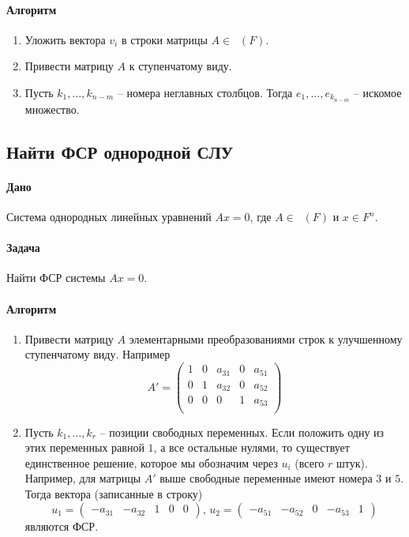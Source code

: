 \documentclass{article}
\newcommand{\MatrixDim}[3]{\mathop{\mathrm{M}_{#2\,#3}}(#1)}
\begin{document}
\paragraph{Алгоритм}
\begin{enumerate}
\item Уложить вектора $v_i$ в строки матрицы $A\in\MatrixDim{F}{m}{n}$.

\item Привести матрицу $A$ к ступенчатому виду.

\item Пусть $k_1,\ldots,k_{n-m}$ -- номера неглавных столбцов. Тогда $e_1,\ldots,e_{k_{n-m}}$ -- искомое множество.
\end{enumerate}

\subsection{Найти ФСР однородной СЛУ}

\paragraph{Дано} Система однородных линейных уравнений $Ax = 0$, где $A\in \MatrixDim{F}{m}{n}$ и $x\in F^{n}$.

\paragraph{Задача} Найти ФСР системы $Ax = 0$.

\paragraph{Алгоритм}
\begin{enumerate}
\item Привести матрицу $A$ элементарными преобразованиями строк к улучшенному ступенчатому виду. Например
\[
A' = 
\begin{pmatrix}
{1}&{0}&{a_{31}}&{0}&{a_{51}}\\
{0}&{1}&{a_{32}}&{0}&{a_{52}}\\
{0}&{0}&{0}&{1}&{a_{53}}\\
\end{pmatrix}
\]

\item Пусть $k_1,\ldots,k_r$ -- позиции свободных переменных. Если положить одну из этих переменных равной $1$, а все остальные нулями, то существует единственное решение, которое мы обозначим через $u_i$ (всего $r$ штук). Например, для матрицы $A'$ выше свободные переменные имеют номера $3$ и $5$. Тогда вектора (записанные в строку)
\[
u_1 = 
\begin{pmatrix}
{-a_{31}}&{-a_{32}}&{1}&{0}&{0}
\end{pmatrix},\,
u_2 = 
\begin{pmatrix}
{-a_{51}}&{-a_{52}}&{0}&{-a_{53}}&{1}
\end{pmatrix}
\]
являются ФСР.
\end{enumerate}
\end{document}
